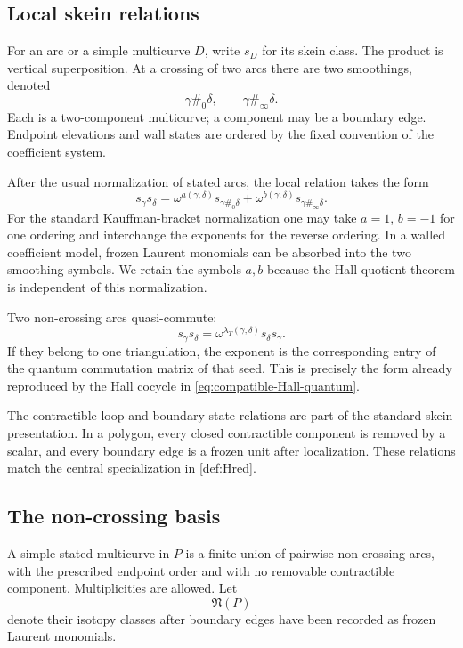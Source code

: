 \subsection{Local skein relations}

For an arc or a simple multicurve $D$, write $s_D$ for its skein class.  The
product is vertical superposition.  At a crossing of two arcs there are two
smoothings, denoted
\[
 \gamma\#_0\delta,
 \qquad
 \gamma\#_\infty\delta.
\]
Each is a two-component multicurve; a component may be a boundary edge.
Endpoint elevations and wall states are ordered by the fixed convention of the
coefficient system.

After the usual normalization of stated arcs, the local relation takes the
form
\begin{equation}
 s_\gamma s_\delta
 =\omega^{a(\gamma,\delta)}s_{\gamma\#_0\delta}
  +\omega^{b(\gamma,\delta)}s_{\gamma\#_\infty\delta}.
 \label{eq:quantum-skein-relation}
\end{equation}
For the standard Kauffman-bracket normalization one may take
$a=1$, $b=-1$ for one ordering and interchange the exponents for the reverse
ordering.  In a walled coefficient model, frozen Laurent monomials can be
absorbed into the two smoothing symbols.  We retain the symbols $a,b$ because
the Hall quotient theorem is independent of this normalization.

Two non-crossing arcs quasi-commute:
\begin{equation}
 s_\gamma s_\delta
 =\omega^{\lambda_T(\gamma,\delta)}s_\delta s_\gamma.
 \label{eq:skein-quasicommutation}
\end{equation}
If they belong to one triangulation, the exponent is the corresponding entry
of the quantum commutation matrix of that seed.  This is precisely the form
already reproduced by the Hall cocycle in
\eqref{eq:compatible-Hall-quantum}.

The contractible-loop and boundary-state relations are part of the standard
skein presentation.  In a polygon, every closed contractible component is
removed by a scalar, and every boundary edge is a frozen unit after
localization.  These relations match the central specialization in
\cref{def:Hred}.

\subsection{The non-crossing basis}

A simple stated multicurve in $P$ is a finite union of pairwise non-crossing
arcs, with the prescribed endpoint order and with no removable contractible
component.  Multiplicities are allowed.  Let
\[
 \mathfrak N(P)
\]
denote their isotopy classes after boundary edges have been recorded as frozen
Laurent monomials.

